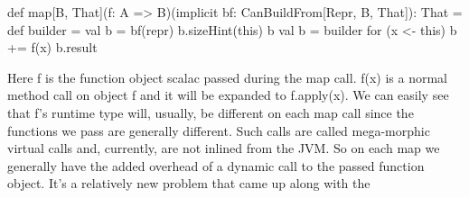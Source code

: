 def map[B, That](f: A => B)(implicit bf: CanBuildFrom[Repr, B, That]): That =
{
    def builder = {
      val b = bf(repr)
      b.sizeHint(this)
      b
    }
    val b = builder
    for (x <- this) b += f(x)
    b.result
}

Here f is the function object scalac passed during the map call. f(x) is a
normal method call on object f and it will be expanded to f.apply(x). We can
easily see that f's runtime type will, usually, be different on each map call
since the functions we pass are generally different. Such calls are called
mega-morphic virtual calls and, currently, are not inlined from the JVM. So on
each map we generally have the added overhead of a dynamic call to the passed
function object. It's a relatively new problem that came up along with the 
